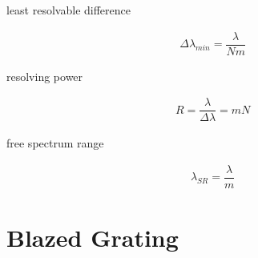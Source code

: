least resolvable difference

\begin{equation*}
  \begin{aligned}
    & \Delta \lambda_{min} = \dfrac{\lambda}{N m}
  \end{aligned}
\end{equation*}

resolving power

\begin{equation*}
  \begin{aligned}
    & R = \dfrac{\lambda}{\Delta \lambda} = mN 
  \end{aligned}
\end{equation*}

free spectrum range

\begin{equation*}
  \begin{aligned}
    & \lambda_{SR} = \dfrac{\lambda}{m} 
  \end{aligned}
\end{equation*}

\section{Blazed Grating}


